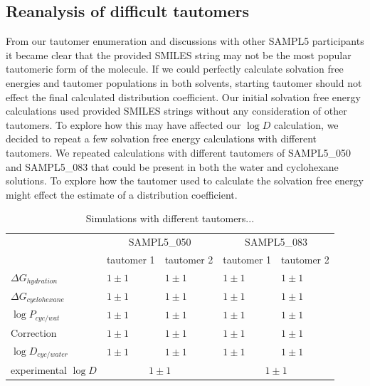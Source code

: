 \subsection{Reanalysis of difficult tautomers} %
\label{results:7}
From our tautomer enumeration and discussions with other SAMPL5 participants %
it became clear that the provided SMILES string may not be the most popular %
tautomeric form of the molecule. 
If we could perfectly calculate solvation free energies and tautomer populations in both solvents, starting tautomer should not effect the final calculated distribution coefficient.  
Our initial solvation free energy calculations used provided SMILES strings without any consideration of other tautomers.
To explore how this may have affected our $\log D$ calculation, we decided to repeat a few solvation free energy calculations with different tautomers. 
We repeated calculations with different tautomers of SAMPL5\_050 and SAMPL5\_083 that could be present in both the water and cyclohexane solutions. 
To explore how the tautomer used to calculate the solvation free energy might effect the estimate of a distribution coefficient. 

\begin{table}
\begin{tabular}{l | l l | l l}
\hline
& \multicolumn{2}{|c|}{SAMPL5\_050} & \multicolumn{2}{c}{SAMPL5\_083} \\
& tautomer 1 & tautomer 2 & tautomer 1 & tautomer 2 \\
\hline
$\Delta G_{hydration}$ & $ 1 \pm 1 $ &  $ 1 \pm 1$ &  $1 \pm 1$ &  $1 \pm 1$ \\
$\Delta G_{cyclohexane}$ & $ 1 \pm 1 $ &  $ 1 \pm 1$ &  $1 \pm 1$ &  $1 \pm 1$ \\
$\log P_{cyc/wat}$ & $ 1 \pm 1 $ &  $ 1 \pm 1$ &  $1 \pm 1$ &  $1 \pm 1$ \\
Correction & $ 1 \pm 1 $ &  $ 1 \pm 1$ &  $1 \pm 1$ &  $1 \pm 1$ \\
$\log D_{cyc/water}$ & $ 1 \pm 1 $ &  $ 1 \pm 1$ &  $1 \pm 1$ &  $1 \pm 1$ \\
\hline
experimental $\log D$ & \multicolumn{2}{|c|}{$1 \pm 1$} & \multicolumn{2}{c}{$1 \pm 1$} \\
\hline
\end{tabular}
\label{tautomerChanges}
\caption{Simulations with different tautomers...}
\end{table}



